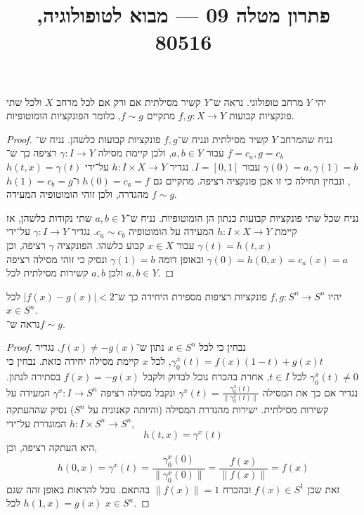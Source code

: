 
\title{פתרון מטלה 09 --- מבוא לטופולוגיה, 80516}

\usepackage{pgfplots}
\pgfplotsset{width=7cm,compat=1.18}


\maketitle
\maketitleprint[purple]

\question{}
יהי $Y$ מרחב טופולוגי.
נראה ש־$Y$ קשיר מסילתית אם ורק אם לכל מרחב $X$ ולכל שתי פונקציות קבועות $f, g : X \to Y$ מתקיים $f \sim g$, כלומר הפונקציות הומוטופיות.
\begin{proof}
	נניח שהמרחב $Y$ קשיר מסילתית ונניח ש־$f, g$ פונקציות קבועות כלשהן.
	נניח ש־$f = c_a, g = c_b$ עבור $a, b \in Y$, ולכן קיימת מסילה $\gamma : I \to Y$ רציפה כך ש־$\gamma(0) = a, \gamma(1) = b$ עבור $I = [0, 1]$.
	נגדיר $h : I \times X \to Y$ על־ידי $h(t, x) = \gamma(t)$, ונבחין תחילה כי זו אכן פונקציה רציפה.
	מתקיים גם $h(0) = c_a = f$ ו־$h(1) = c_b = g$ מהגדרה, ולכן זוהי הומוטופיה המעידה $f \sim g$.

	נניח שכל שתי פונקציות קבועות כנתון הן הומוטופיות.
	נניח ש־$a, b \in Y$ שתי נקודות כלשהן, אז קיימת $h : I \times X \to Y$ המעידה על הומוטופיה $c_a \sim c_b$.
	נגדיר $\gamma : I \to Y$ על־ידי $\gamma(t) = h(t, x)$ עבור $x \in X$ קבוע כלשהו.
	הפונקציה $\gamma$ רציפה, וכן $\gamma(0) = h(0, x) = c_a(x) = a$ ובאופן דומה $\gamma(1) = b$ ונסיק כי זוהי מסילה רציפה ולכן $a, b$ קשירות מסילתית לכל $a, b \in Y$.
\end{proof}

\question{}
יהיו $f, g : S^n \to S^n$ פונקציות רציפות מספירת היחידה כך ש־$|f(x) - g(x)| < 2$ לכל $x \in S^n$. \\
נראה ש־$f \sim g$.
\begin{proof}
	נבחין כי לכל $x \in S^n$ נתון ש־$f(x) \ne -g(x)$.
	נגדיר $\gamma_0^x(t) = f(x) (1 - t) + g(x) t$, לכל $x$ קיימת מסילה יחידה כזאת.
	נבחין כי $\gamma_0^x(t) \ne 0$ לכל $t \in I$, אחרת בהכרח נוכל לבדוק ולקבל $f(x) = -g(x)$ בסתירה לנתון.
	נגדיר אם כך את המסילה $\gamma^x(t) = \frac{\gamma_0^x(t)}{\lVert \gamma_0^x(t) \rVert}$ ונקבל מסילה רציפה $\gamma^x : I \to S^n$ המעידה על קשירות מסילתית.
	ישירות מהגדרת המסילה (והיותה קאנונית על $S^n$) נסיק שההעתקה $h : I \times S^n \to S^n$ המוגדרת על־ידי,
	\[
		h(t, x)
		= \gamma^x(t)
	\]
	היא העתקה רציפה, וכן,
	\[
		h(0, x)
		= \gamma^x(t)
		= \frac{\gamma_0^x(0)}{\lVert \gamma_0^x(0) \rVert}
		= \frac{f(x)}{\lVert f(x) \rVert}
		= f(x)
	\]
	זאת שכן $f(x) \in S^1$ ובהכרח $\lVert f(x) \rVert = 1$ בהתאם.
	נוכל להראות באופן זהה שגם $h(1, x) = g(x)$ לכל $x \in S^n$.
\end{proof}

